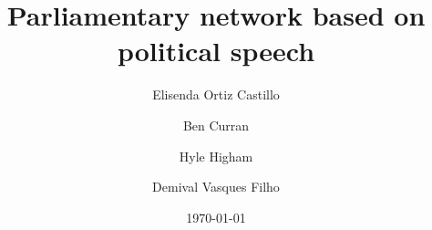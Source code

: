 \documentclass[%
reprint,
amsmath,amssymb,
aps,
]{revtex4-1}
\begin{document}
	
	
\title{Parliamentary network based on political speech}%

\author{Elisenda Ortiz Castillo}
\author{Ben Curran}%
\author{Hyle Higham}
\author{Demival Vasques Filho}
	
	
	
	
\date{\today}%
	
\begin{abstract}

  
 
\end{abstract}
\end{document}
